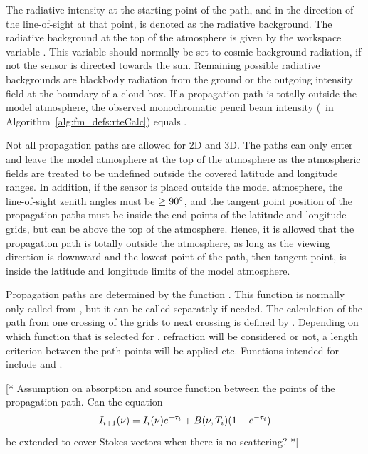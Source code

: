 The radiative intensity at the starting point of the path, and in the
direction of the line-of-sight at that point, is denoted as the
radiative background. The radiative background at the top of the
atmosphere is given by the workspace variable . This
variable should normally be set to cosmic background radiation, if
not the sensor is directed towards the sun. Remaining possible
radiative backgrounds are blackbody radiation from the ground or the
outgoing intensity field at the boundary of a cloud box. If a
propagation path is totally outside the model atmosphere, the
observed monochromatic pencil beam intensity (\MpiVct\ in
Algorithm~\ref{alg:fm_defs:rteCalc}) equals .

Not all propagation paths are allowed for 2D and 3D. The paths can
only enter and leave the model atmosphere at the top of the atmosphere
as the atmospheric fields are treated to be undefined outside the
covered latitude and longitude ranges. In addition, if the sensor is
placed outside the model atmosphere, the line-of-sight zenith angles
must be $\geq90^\circ$, and the tangent point position of the
propagation paths must be inside the end points of the latitude and
longitude grids, but can be above the top of the atmosphere. Hence, it
is allowed that the propagation path is totally outside the
atmosphere, as long as the viewing direction is downward and the
lowest point of the path, then tangent point, is inside the latitude
and longitude limits of the model atmosphere.

Propagation paths are determined by the function .
This function is normally only called from , but it
can be called separately if needed. The calculation of the path from
one crossing of the grids to next crossing is defined by
. Depending on which function that is
selected for , refraction will be
considered or not, a length criterion between the path points will be
applied etc. Functions intended for 
include  and
.


\label{sec:fm_defs:solverte}

[* Assumption on absorption and source function between the points of
the propagation path. Can the equation 
\begin{equation}
  I_{i+1}(\nu) = I_i(\nu)e^{-\tau_{i}} + B(\nu,T_{i})(1-e^{-\tau_{i}})
\end{equation}
be extended to cover Stokes vectors when there is no scattering? *]



